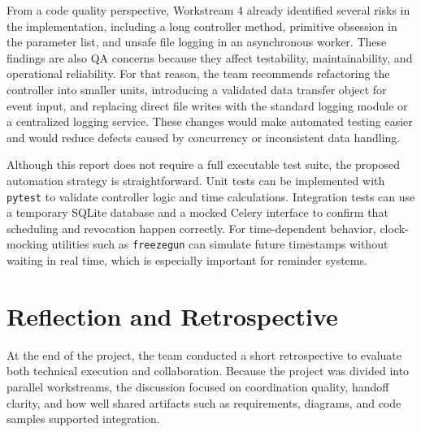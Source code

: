 From a code quality perspective, Workstream 4 already identified several risks in the implementation, including a long controller method, primitive obsession in the parameter list, and unsafe file logging in an asynchronous worker. These findings are also QA concerns because they affect testability, maintainability, and operational reliability. For that reason, the team recommends refactoring the controller into smaller units, introducing a validated data transfer object for event input, and replacing direct file writes with the standard logging module or a centralized logging service. These changes would make automated testing easier and would reduce defects caused by concurrency or inconsistent data handling.

Although this report does not require a full executable test suite, the proposed automation strategy is straightforward. Unit tests can be implemented with \texttt{pytest} to validate controller logic and time calculations. Integration tests can use a temporary SQLite database and a mocked Celery interface to confirm that scheduling and revocation happen correctly. For time-dependent behavior, clock-mocking utilities such as \texttt{freezegun} can simulate future timestamps without waiting in real time, which is especially important for reminder systems.

\section{Reflection and Retrospective}
At the end of the project, the team conducted a short retrospective to evaluate both technical execution and collaboration. Because the project was divided into parallel workstreams, the discussion focused on coordination quality, handoff clarity, and how well shared artifacts such as requirements, diagrams, and code samples supported integration.

